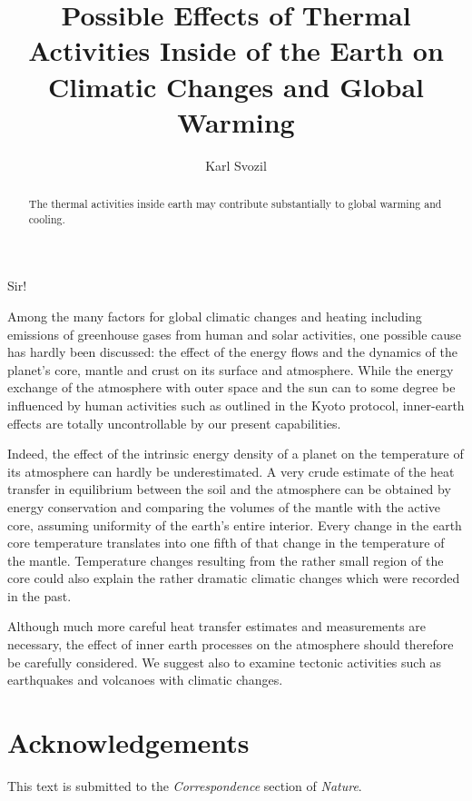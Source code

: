 \documentclass[prl,amsfonts,showpacs,showkeys,preprint]{revtex4}
\begin{document}
\title{Possible Effects of Thermal Activities Inside of the Earth on Climatic Changes and Global Warming}


\author{Karl Svozil}


\begin{abstract}
The thermal activities inside earth may contribute substantially to global warming and cooling.
\end{abstract}





\maketitle

Sir!

Among the many factors for global climatic changes and heating including emissions of
greenhouse gases from human and solar activities,
one possible cause has hardly been discussed:
the effect of the energy flows and the dynamics of the planet's core, mantle and crust on its surface and atmosphere.
While the energy exchange of the atmosphere with outer space and the sun can to some degree be influenced by human activities
such as outlined in the Kyoto protocol,
inner-earth effects are totally uncontrollable by our present capabilities.

Indeed, the effect of the intrinsic energy density of a planet on the temperature of its atmosphere can hardly be underestimated.
A very crude estimate of the heat transfer in equilibrium between the soil and the atmosphere
can be obtained by energy conservation and comparing the volumes of the mantle with the active core,
assuming uniformity of the earth's entire interior.
Every change in the earth core temperature translates into one fifth of that change in the temperature of the mantle.
Temperature changes resulting from the rather small region of the core could also explain the rather dramatic
climatic changes which were recorded in the past.

Although much more careful heat transfer estimates and measurements are necessary,
the effect of inner earth processes on the atmosphere should therefore be carefully considered.
We suggest also to examine tectonic activities such as earthquakes and volcanoes with climatic changes.



\section *{Acknowledgements}

This text is submitted to the {\em Correspondence} section of {\em Nature}.



%
%
%
\end{document}
